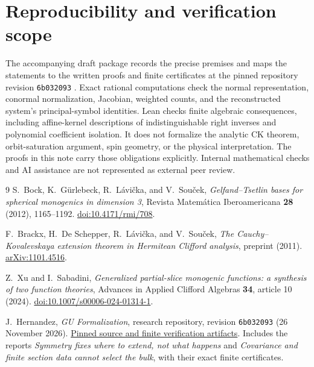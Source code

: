 \documentclass[11pt]{article}
\theoremstyle{definition}\newtheorem{definition}[theorem]{Definition}
\theoremstyle{remark}\newtheorem{remark}[theorem]{Remark}
\begin{document}
\section{Reproducibility and verification scope}
The accompanying draft package records the precise premises and maps the statements to the written proofs and finite certificates at the pinned repository revision \texttt{6b032093} \cite{Repo}. Exact rational computations check the normal representation, conormal normalization, Jacobian, weighted counts, and the reconstructed system's principal-symbol identities. Lean checks finite algebraic consequences, including affine-kernel descriptions of indistinguishable right inverses and polynomial coefficient isolation. It does not formalize the analytic CK theorem, orbit-saturation argument, spin geometry, or the physical interpretation. The proofs in this note carry those obligations explicitly. Internal mathematical checks and AI assistance are not represented as external peer review.

\begin{thebibliography}{9}
S.~Bock, K.~G\"urlebeck, R.~L\'avi\v cka, and V.~Sou\v cek,
\emph{Gelfand--Tsetlin bases for spherical monogenics in dimension 3},
Revista Matem\'atica Iberoamericana \textbf{28} (2012), 1165--1192.
\href{https://doi.org/10.4171/rmi/708}{doi:10.4171/rmi/708}.

F.~Brackx, H.~De Schepper, R.~L\'avi\v cka, and V.~Sou\v cek,
\emph{The Cauchy--Kovalevskaya extension theorem in Hermitean Clifford analysis},
preprint (2011). \href{https://arxiv.org/abs/1101.4516}{arXiv:1101.4516}.

Z.~Xu and I.~Sabadini,
\emph{Generalized partial-slice monogenic functions: a synthesis of two function theories},
Advances in Applied Clifford Algebras \textbf{34}, article 10 (2024).
\href{https://doi.org/10.1007/s00006-024-01314-1}{doi:10.1007/s00006-024-01314-1}.

J.~Hernandez, \emph{GU Formalization}, research repository,
revision \texttt{6b032093} (26 November 2026).
\href{https://github.com/disruptionjoe/gu-formalization/tree/6b03209312a9ae4a73798e45fb909601c9c148b3}{Pinned source and finite verification artifacts}.
Includes the reports \emph{Symmetry fixes where to extend, not what happens} and \emph{Covariance and finite section data cannot select the bulk}, with their exact finite certificates.
\end{thebibliography}
\end{document}
